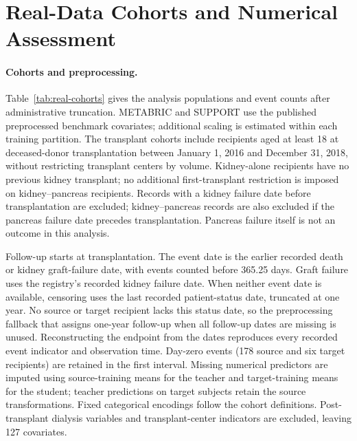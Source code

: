 \documentclass{article} %
\begin{document}


\section{Real-Data Cohorts and Numerical Assessment}
\label{app:real-data}




\paragraph{Cohorts and preprocessing.}
Table~\ref{tab:real-cohorts} gives the analysis populations and event counts after administrative truncation. METABRIC and SUPPORT use the published preprocessed benchmark covariates; additional scaling is estimated within each training partition. The transplant cohorts include recipients aged at least 18 at deceased-donor transplantation between January 1, 2016 and December 31, 2018, without restricting transplant centers by volume. Kidney-alone recipients have no previous kidney transplant; no additional first-transplant restriction is imposed on kidney--pancreas recipients. Records with a kidney failure date before transplantation are excluded; kidney--pancreas records are also excluded if the pancreas failure date precedes transplantation. Pancreas failure itself is not an outcome in this analysis.

Follow-up starts at transplantation. The event date is the earlier recorded death or kidney graft-failure date, with events counted before 365.25 days. Graft failure uses the registry's recorded kidney failure date. When neither event date is available, censoring uses the last recorded patient-status date, truncated at one year. No source or target recipient lacks this status date, so the preprocessing fallback that assigns one-year follow-up when all follow-up dates are missing is unused. Reconstructing the endpoint from the dates reproduces every recorded event indicator and observation time. Day-zero events (178 source and six target recipients) are retained in the first interval. Missing numerical predictors are imputed using source-training means for the teacher and target-training means for the student; teacher predictions on target subjects retain the source transformations. Fixed categorical encodings follow the cohort definitions. Post-transplant dialysis variables and transplant-center indicators are excluded, leaving 127 covariates.
\end{document}
